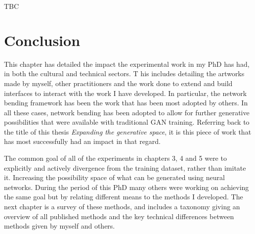 TBC

\section{Conclusion}

This chapter has detailed the impact the experimental work in my PhD has had, in both the cultural and technical sectors. T
his includes detailing the artworks made by myself, other practitioners and the work done to extend and build interfaces to interact with the work I have developed. 
In particular, the network bending framework has been the work that has been most adopted by others. 
In all these cases, network bending has been adopted to allow for further generative possibilities that were available with traditional GAN training. 
Referring back to the title of this thesis \textit{Expanding the generative space}, it is this piece of work that has most successfully had an impact in that regard. 

The common goal of all of the experiments in chapters 3, 4 and 5 were to explicitly and actively divergence from the training dataset, rather than imitate it. 
Increasing the possibility space of what can be generated using neural networks. 
During the period of this PhD many others were working on achieving the same goal but by relating different means to the methods I developed. 
The next chapter is a survey of these methods, and includes a taxonomy giving an overview of all published methods and the key technical differences between methods given by myself and others. 
